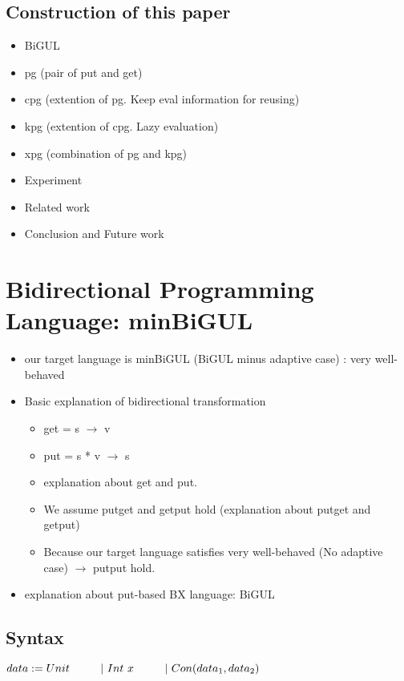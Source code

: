 \documentclass[runningheads]{llncs}
\newcommand{\qtab}{\hspace*{5mm} \ \quad}
\begin{document}
\subsection{Construction of this paper}

\begin{itemize}
\item BiGUL 
\item pg (pair of put and get)
\item cpg (extention of pg. Keep eval information for reusing)
\item kpg (extention of cpg. Lazy evaluation)
\item xpg (combination of pg and kpg)
\item Experiment
\item Related work
\item Conclusion and Future work
\end{itemize}

\section{Bidirectional Programming Language: minBiGUL}

\begin{itemize}
\item our target language is minBiGUL (BiGUL minus adaptive case) : very well-behaved
\item Basic explanation of bidirectional transformation
  \begin{itemize}
  \item get = s $\to$ v
  \item put = s * v $\to$ s
  \item explanation about get and put.
  \item We assume putget and getput hold (explanation about putget and getput)
  \item Because our target language satisfies very well-behaved (No adaptive case) $\to$ putput hold.
  \end{itemize}
\item explanation about put-based BX language: BiGUL
\end{itemize}

\subsection{Syntax}

$data := Unit \\ 
    \qtab | \ Int \ x \\ 
    \qtab | \ Con(data_1, data_2)$\\
\end{document}
